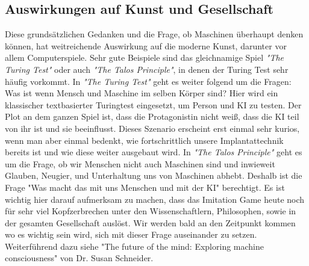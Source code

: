 \subsection{Auswirkungen auf Kunst und Gesellschaft}
Diese grundsätzlichen Gedanken und die Frage, ob Maschinen überhaupt denken können, hat weitreichende Auswirkung auf die moderne Kunst, darunter vor allem Computerspiele. Sehr gute Beispiele sind das gleichnamige Spiel \textit{"The Turing Test"} oder auch \textit{"The Talos Principle"}, in denen der Turing Test sehr häufig vorkommt. In \textit{"The Turing Test"} geht es weiter folgend um die Fragen: Was ist wenn Mensch und Maschine im selben Körper sind? Hier wird ein klassischer textbasierter Turingtest eingesetzt, um Person und KI zu testen. Der Plot an dem ganzen Spiel ist, dass die Protagonistin nicht weiß, dass die KI teil von ihr ist und sie beeinflusst. Dieses Szenario erscheint erst einmal sehr kurios, wenn man aber einmal bedenkt, wie fortschrittlich unsere Implantattechnik bereits ist und wie diese weiter ausgebaut wird. In \textit{"The Talos Principle"} geht es um die Frage, ob wir Menschen nicht auch Maschinen sind und inwieweit Glauben, Neugier, und Unterhaltung uns von Maschinen abhebt. Deshalb ist die Frage "Was macht das mit uns Menschen und mit der KI" berechtigt. Es ist wichtig hier darauf aufmerksam zu machen, dass das Imitation Game heute noch für sehr viel Kopfzerbrechen unter den Wissenschaftlern, Philosophen, sowie in der gesamten Gesellschaft auslöst. Wir werden bald an den Zeitpunkt kommen wo es wichtig sein wird, sich mit dieser Frage auseinander zu setzen. Weiterführend dazu siehe "The future of the mind: Exploring machine consciousness" von Dr. Susan Schneider. \cite{explorecons}
